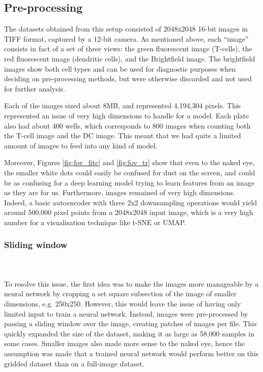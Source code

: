 \subsection{Pre-processing} \label{subsec:preproc}
The datasets obtained from this setup consisted of 2048x2048 16-bit images in TIFF format, captured by a 12-bit camera. As mentioned above, each ``image” consists in fact of a set of three views: the green fluorescent image (T-cells), the red fluorescent image (dendritic cells), and the Brightfield image. The brightfield images show both cell types and can be used for diagnostic purposes when deciding on pre-processing methods, but were otherwise discarded and not used for further analysis.

Each of the images sized about 8MB, and represented 4,194,304 pixels. This represented an issue of very high dimensions to handle for a model. Each plate also had about 400 wells, which corresponds to 800 images when counting both the T-cell image and the DC image. This meant that we had quite a limited amount of images to feed into any kind of model.

Moreover, Figures \ref{fig:fov_fitc} and \ref{fig:fov_tr} show that even to the naked eye, the smaller white dots could easily be confused for dust on the screen, and could be as confusing for a deep learning model trying to learn features from an image as they are for us. Furthermore, images remained of very high dimensions. Indeed, a basic autoencoder with three 2x2 downsampling operations would yield around 500,000 pixel points from a 2048x2048 input image, which is a very high number for a visualisation technique like t-SNE or UMAP.

\bigskip
\subsubsection{Sliding window}

\hfill\\
\hfill\\
To resolve this issue, the first idea was to make the images more manageable by a neural network by cropping a set square subsection of the image of smaller dimensions, e.g. 250x250. However, this would leave the issue of having only limited input to train a neural network. Instead, images were pre-processed by passing a sliding window over the image, creating patches of images per file. This quickly expanded the size of the dataset, making it as large as 58,000 samples in some cases. Smaller images also made more sense to the naked eye, hence the assumption was made that a trained neural network would perform better on this gridded dataset than on a full-image dataset.

